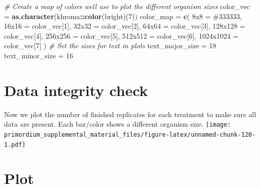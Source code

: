 \documentclass[
]{book}
\newenvironment{Shaded}{\begin{snugshade}}{\end{snugshade}}
\newcommand{\CommentTok}[1]{\textcolor[rgb]{0.56,0.35,0.01}{\textit{#1}}}
\newcommand{\DecValTok}[1]{\textcolor[rgb]{0.00,0.00,0.81}{#1}}
\newcommand{\KeywordTok}[1]{\textcolor[rgb]{0.13,0.29,0.53}{\textbf{#1}}}
\newcommand{\NormalTok}[1]{#1}
\newcommand{\OperatorTok}[1]{\textcolor[rgb]{0.81,0.36,0.00}{\textbf{#1}}}
\newcommand{\StringTok}[1]{\textcolor[rgb]{0.31,0.60,0.02}{#1}}
\begin{document}
\begin{Shaded}
\begin{Highlighting}[]
\CommentTok{\# Create a map of colors we\textquotesingle{}ll use to plot the different organism sizes}
\NormalTok{color\_vec =}\StringTok{ }\KeywordTok{as.character}\NormalTok{(khroma}\OperatorTok{::}\KeywordTok{color}\NormalTok{(}\StringTok{\textquotesingle{}bright\textquotesingle{}}\NormalTok{)(}\DecValTok{7}\NormalTok{))}
\NormalTok{color\_map =}\StringTok{ }\KeywordTok{c}\NormalTok{(}
  \StringTok{\textquotesingle{}8x8\textquotesingle{}}\NormalTok{ =}\StringTok{       \textquotesingle{}\#333333\textquotesingle{}}\NormalTok{,}
  \StringTok{\textquotesingle{}16x16\textquotesingle{}}\NormalTok{ =}\StringTok{     }\NormalTok{color\_vec[}\DecValTok{1}\NormalTok{],}
  \StringTok{\textquotesingle{}32x32\textquotesingle{}}\NormalTok{ =}\StringTok{     }\NormalTok{color\_vec[}\DecValTok{2}\NormalTok{],}
  \StringTok{\textquotesingle{}64x64\textquotesingle{}}\NormalTok{ =}\StringTok{     }\NormalTok{color\_vec[}\DecValTok{3}\NormalTok{],}
  \StringTok{\textquotesingle{}128x128\textquotesingle{}}\NormalTok{ =}\StringTok{   }\NormalTok{color\_vec[}\DecValTok{4}\NormalTok{],}
  \StringTok{\textquotesingle{}256x256\textquotesingle{}}\NormalTok{ =}\StringTok{   }\NormalTok{color\_vec[}\DecValTok{5}\NormalTok{],}
  \StringTok{\textquotesingle{}512x512\textquotesingle{}}\NormalTok{ =}\StringTok{   }\NormalTok{color\_vec[}\DecValTok{6}\NormalTok{],}
  \StringTok{\textquotesingle{}1024x1024\textquotesingle{}}\NormalTok{ =}\StringTok{ }\NormalTok{color\_vec[}\DecValTok{7}\NormalTok{]}
\NormalTok{)}
\CommentTok{\# Set the sizes for text in plots}
\NormalTok{text\_major\_size =}\StringTok{ }\DecValTok{18}
\NormalTok{text\_minor\_size =}\StringTok{ }\DecValTok{16} 
\end{Highlighting}
\end{Shaded}

\hypertarget{data-integrity-check-7}{%
\section{Data integrity check}\label{data-integrity-check-7}}

Now we plot the number of finished replicates for each treatment to make sure all data are present.
Each bar/color shows a different organism size.
\texttt{[image: primordium\_supplemental\_material\_files/figure-latex/unnamed-chunk-120-1.pdf]}

\hypertarget{plot-2}{%
\section{Plot}\label{plot-2}}
\end{document}
